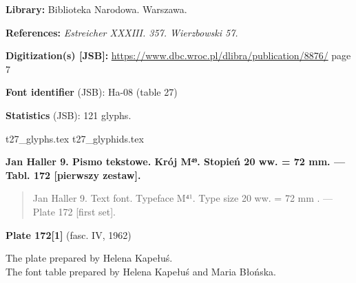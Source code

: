 \documentclass[12pt]{article}
\newcommand{\bg}{\begingl}
\newcommand{\pismoPL}[1]{{\relsize{2}\Junicode\textbf{#1}}}
\newcommand{\pismoEN}[1]{{\relsize{1}\Junicode\begin{quote}#1\end{quote}}}
\newcommand{\plate}[3]{\textbf{Plate #1} (fasc. #2, #3)}
\newcommand{\exampleDig}[1]{{\relsize{0}\Junicode \textbf{Digitization(s) [JSB]:} #1}}
\newcommand{\exampleLib}[1]{{\relsize{0}\Junicode \textbf{Library:} #1}}
\newcommand{\examplePL}[1]{}
\newcommand{\exampleEN}[1]{}
\newcommand{\fontID}[2]{{\relsize{1}\Junicode\textbf{Font identifier} (JSB): #1 (table #2)}}
\newcommand{\fontstat}[1]{{\relsize{1}\Junicode\textbf{Statistics} (JSB): #1 glyphs.}}
\newcommand{\exampleRef}[1]{{\relsize{0}\Junicode \textbf{References:} #1}}
\begin{document}
  \bigskip
\exampleLib{Biblioteka Narodowa. Warszawa.}


\bigskip
\exampleRef{\textit{Estreicher XXXIII. 357. Wierzbowski 57.}}

\bigskip
\exampleDig{\url{https://www.dbc.wroc.pl/dlibra/publication/8876/} page 7} 







\bigskip

    \examplePL{Pismo 12: wiersz 1, 4. [Pismo 8: tekst - JSB]}

    \medskip

    \exampleEN{Font 12: the lines 1, 4. [Font 8: the text - JSB]}


\bigskip


\fontID{Ha-08}{27}

\fontstat{121}

  {t27_glyphs.tex}
  {t27_glyphids.tex}

 \newpage



 
  \pismoPL{Jan Haller 9. Pismo tekstowe. Krój M⁴⁹. Stopień 20 ww. = 72 mm. — Tabl. 172 [pierwszy zestaw].}
  
\pismoEN{Jan Haller 9. Text font. Typeface M⁴¹. Type size 20 ww. =
    72 mm . — Plate 172 [first set].}

\plate{172[1]}{IV}{1962}

The plate prepared by Helena Kapełuś.\\
The font table prepared by Helena Kapełuś and Maria Błońska.
\end{document}
